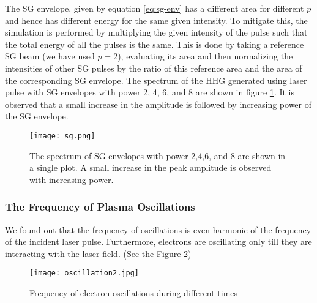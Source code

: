 


The SG envelope, given by equation \ref{eq:sg-env} has a different area for different $p$ and hence has different energy for the same given intensity. To mitigate this, the simulation is performed by multiplying the given intensity of the pulse such that the total energy of all the pulses is the same. This is done by taking a reference SG beam (we have used $p=2$), evaluating its area and then normalizing the intensities of other SG pulses by the ratio of this reference area and the area of the corresponding SG envelope. The spectrum of the HHG generated using laser pulse with SG envelopes with power 2, 4, 6, and 8 are shown in figure \ref{fig:sg}. It is observed that a small increase in the amplitude is followed by increasing power of the SG envelope.

\begin{figure}[H]
    \centering
    \texttt{[image: sg.png]}
    \caption{The spectrum of SG envelopes with power 2,4,6, and 8 are shown in a single plot. A small increase in the peak amplitude is observed with increasing power.}
    \label{fig:sg}
\end{figure}


\subsubsection{The Frequency of Plasma Oscillations}
We found out that the frequency of oscillations is even harmonic of the frequency of the incident laser pulse. Furthermore, electrons are oscillating only till they are interacting with the laser field. (See the Figure \ref{fig:oscillation2})

\begin{figure}[h]
    \centering
    \texttt{[image: oscillation2.jpg]}
    \caption{Frequency of electron oscillations during different times}
    \label{fig:oscillation2}
\end{figure}

